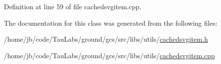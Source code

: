 \-Definition at line 59 of file cachedsvgitem.\-cpp.



\-The documentation for this class was generated from the following files\-:\begin{DoxyCompactItemize}
\item 
/home/jb/code/\-Tau\-Labs/ground/gcs/src/libs/utils/\hyperlink{cachedsvgitem_8h}{cachedsvgitem.\-h}\item 
/home/jb/code/\-Tau\-Labs/ground/gcs/src/libs/utils/\hyperlink{cachedsvgitem_8cpp}{cachedsvgitem.\-cpp}\end{DoxyCompactItemize}
